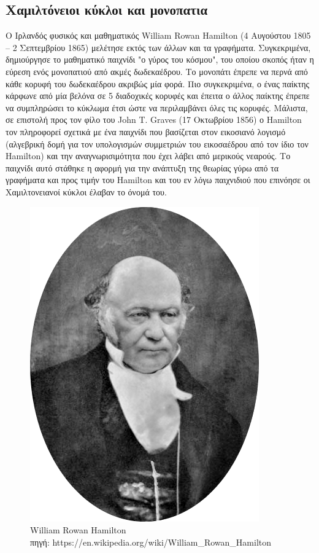 \documentclass[oneside,12pt]{book}
\newenvironment{matlab}
	{\begin{figure}[hp]\centering\captionsetup{justification=centering}}
	{\end{figure}}
\theoremstyle{definition}
\begin{document}
\subsection{Χαμιλτόνειοι κύκλοι και μονοπατια}

O Ιρλανδός φυσικός και μαθηματικός William Rowan Hamilton (4 Αυγούστου 1805 – 2 Σεπτεμβρίου 1865) μελέτησε εκτός των άλλων και τα γραφήματα. Συγκεκριμένα, δημιούργησε το μαθηματικό παιχνίδι "ο γύρος του κόσμου", του οποίου σκοπός ήταν η εύρεση ενός μονοπατιού από ακμές δωδεκαέδρου. Το μονοπάτι έπρεπε να περνά από κάθε κορυφή του δωδεκαέδρου ακριβώς μία φορά. Πιο συγκεκριμένα, ο ένας παίκτης κάρφωνε από μία βελόνα σε 5 διαδοχικές κορυφές και έπειτα ο άλλος παίκτης έπρεπε να συμπληρώσει το κύκλωμα έτσι ώστε να περιλαμβάνει όλες τις κορυφές. Μάλιστα, σε επιστολή προς τον φίλο του John T. Graves (17 Οκτωβρίου 1856) ο Hamilton τον πληροφορεί σχετικά με ένα παιχνίδι που βασίζεται στον εικοσιανό λογισμό (αλγεβρική δομή για τον υπολογισμών συμμετριών του εικοσαέδρου από τον ίδιο τον Hamilton) και την αναγνωρισιμότητα που έχει λάβει από μερικούς νεαρούς. Το παιχνίδι αυτό στάθηκε η αφορμή για την ανάπτυξη της θεωρίας γύρω από τα γραφήματα και προς τιμήν του Hamilton και του εν λόγω παιχνιδιού που επινόησε οι Χαμιλτονειανοί κύκλοι έλαβαν το όνομά του. \\

\begin{matlab}
	\includegraphics[scale=0.2]{images/Hamilton.png}
	\caption{William Rowan Hamilton \\ πηγή: https://en.wikipedia.org/wiki/William\_Rowan\_Hamilton}
\end{matlab}
\end{document}
